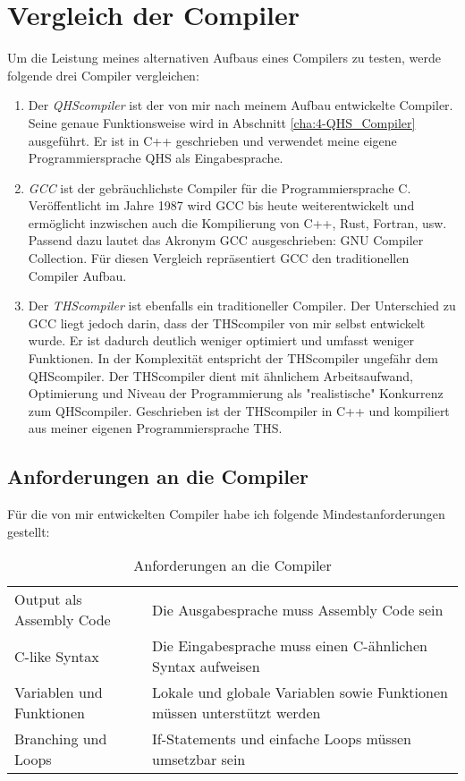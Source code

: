 \chapter{Vergleich der Compiler} \label{cha:2-Vergleich}
Um die Leistung meines alternativen Aufbaus eines Compilers zu testen, werde folgende drei Compiler vergleichen:

\begin{enumerate}
\item
Der \textit{QHScompiler} ist der von mir nach meinem Aufbau entwickelte Compiler. Seine genaue Funktionsweise wird in Abschnitt \ref{cha:4-QHS_Compiler} ausgeführt.
Er ist in C++ geschrieben und verwendet meine eigene Programmiersprache QHS als Eingabesprache. 

\item
\textit{GCC} ist der gebräuchlichste Compiler für die Programmiersprache C. Veröffentlicht im Jahre 1987 wird GCC bis heute weiterentwickelt und ermöglicht inzwischen auch die Kompilierung von C++, Rust, Fortran, usw.
Passend dazu lautet das Akronym GCC ausgeschrieben: GNU Compiler Collection.
Für diesen Vergleich repräsentiert GCC den traditionellen Compiler Aufbau.

\item
Der \textit{THScompiler} ist ebenfalls ein traditioneller Compiler. Der Unterschied zu GCC liegt jedoch darin, dass der THScompiler von mir selbst entwickelt wurde. 
Er ist dadurch deutlich weniger optimiert und umfasst weniger Funktionen. In der Komplexität entspricht der THScompiler ungefähr dem QHScompiler.
Der THScompiler dient mit ähnlichem Arbeitsaufwand, Optimierung und Niveau der Programmierung als "realistische" Konkurrenz zum QHScompiler.
Geschrieben ist der THScompiler in C++ und kompiliert aus meiner eigenen Programmiersprache THS.
\end{enumerate}

\section{Anforderungen an die Compiler} \label{sec:requirements}
Für die von mir entwickelten Compiler habe ich folgende Mindestanforderungen gestellt:

\begin{table}[H]
    \centering
    \caption{Anforderungen an die Compiler}
    \vspace{3mm} %
    
    \begin{tabular}{l|l}
    Output als Assembly Code        & Die Ausgabesprache muss Assembly Code sein                               \\
    C-like Syntax                   & Die Eingabesprache muss einen C-ähnlichen Syntax aufweisen               \\
    Variablen und Funktionen        & Lokale und globale Variablen sowie Funktionen müssen unterstützt werden  \\
    Branching und Loops             & If-Statements und einfache Loops müssen umsetzbar sein
    \end{tabular}
\end{table}


